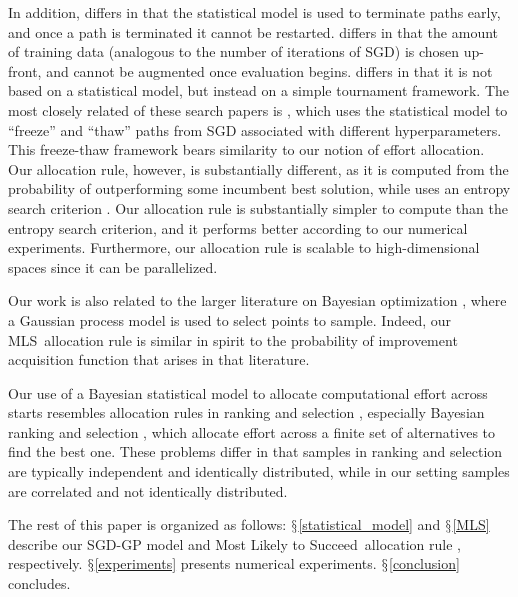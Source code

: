 \documentclass[12pt,english]{article}
\newcommand{\pfcomment}[1]{{\color{red} PF: #1}}
\newcommand{\stedit}[1]{{\color{blue} #1}}
\newcommand{\abbrv}{MLS}
\newcommand{\name}{Most Likely to Succeed}
\begin{document}
In addition, \cite{Hutter:2015} differs in that the statistical model is used to terminate paths early, and once a path is terminated it cannot be restarted. \cite{klein2016fast} differs in that the amount of training data (analogous to the number of iterations of SGD) is chosen up-front, and cannot be augmented once evaluation begins. \cite{li2016}  differs in that it is not based on a statistical model, but instead on a simple tournament framework.
The most closely related of these search papers is \cite{Swersky:2014}, which uses the statistical model to ``freeze'' and ``thaw'' paths from SGD associated with different hyperparameters.  This freeze-thaw framework bears similarity to our notion of effort allocation.  Our allocation rule, however, is substantially different, as it is computed from the probability of outperforming some incumbent best solution, while \cite{Swersky:2014} uses an entropy search criterion \citep{entropySearch}.  \stedit{Our allocation rule is substantially simpler to compute than the entropy search criterion, and it performs better according to our numerical experiments. Furthermore, our allocation rule is scalable to high-dimensional spaces since it can be parallelized.}

Our work is also related to the larger literature on Bayesian optimization \citep{jones1998efficient,forrester2008engineering,brochu2010tutorial,frazier2009knowledge}, where a Gaussian process model is used to select points to sample.  Indeed, our \abbrv\ allocation rule is similar in spirit to the probability of improvement acquisition function \citep{brochu2010tutorial}  that arises in that literature. 

Our use of a Bayesian statistical model to allocate computational effort across starts resembles allocation rules in ranking and selection \citep{Bechhofer:1995,kim:2007,kim:20062}, especially Bayesian ranking and selection \citep{frazier2009knowledge}, which allocate effort across a finite set of alternatives to find the best one.  These problems differ in that samples in ranking and selection are typically independent and identically distributed, while in our setting samples are correlated and not identically distributed.

The rest of this paper is organized as follows: $\mathsection$\ref{statistical_model} and $\mathsection$\ref{MLS} describe our SGD-GP model and \name\ allocation rule\stedit{, respectively}. $\mathsection$\ref{experiments} presents numerical experiments. $\mathsection$\ref{conclusion} concludes.
\end{document}
